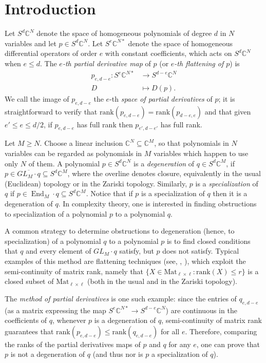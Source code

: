 \documentclass{toc}
\newcommand{\bbC}{\mathbb{C}}
\DeclareMathOperator{\End}{End}
\def\BC{\mathbb C}
\def\trank{\mathrm{rank}}
\newcommand{\Mat}{\mathrm{Mat}}
\begin{document}
\section{Introduction} 
 Let $S^d\BC^N$ denote the space of homogeneous polynomials of degree $d$ in $N$ variables and let $p\in S^d\BC^N$. Let $S^e\BC^{N*}$ denote the space of homogeneous differential operators of order $e$ with constant coefficients, which acts on $S^d\BC^N$ when $e\leq d$. The \emph{$e$-th partial derivative map}  of $p$  (or \emph{$e$-th flattening of $p$}) is
\begin{align} \label{flateqn}
p_{e,d-e}: S^e\BC^{N*}& \to S^{d-e}\BC^N\\
\nonumber D & \mapsto D(p).
\end{align}
 We call the image of $p_{e,d-e}$ the $e$-th \emph{space of partial derivatives} of $p$; it is straightforward to verify that $\trank (p_{e,d-e}) = \trank (p_{d-e,e})$ and that given $e' \leq e \leq d/2$, if $p_{e,d-e}$ has full rank then $p_{e',d-e'}$ has full rank.

Let $M\geq N$. Choose a linear inclusion $\bbC^N \subseteq \bbC^M$, so that polynomials in $N$ variables can be regarded as polynomials in $M$ variables which happen to use only $N$ of them. A polynomial $p\in S^d\BC^N$ is a \emph{degeneration} of $q\in S^d\BC^M$, if  $p\in \overline{GL_M\cdot q}\subseteq S^d\BC^M$, where the overline denotes closure, equivalently in the usual (Euclidean) topology or in the Zariski topology.  Similarly, $p$ is a \emph{specialization} of $q$ if $p \in \End_{M} \cdot q \subseteq S^d \bbC^M$. Notice that if $p$ is a specialization of $q$ then it is a degeneration of $q$. In complexity theory, one is interested in finding obstructions to specialization of a polynomial $p$ to a polynomial $q$.  

A common strategy to determine obstructions to degeneration (hence, to specialization) of a polynomial $q$ to a polynomial $p$ is to find closed conditions that $q$ and every element of $GL_M \cdot q$ satisfy, but $p$ does not satisfy. Typical examples of this method are flattening techniques (see, \eg, \cite{MR2901512}), which exploit the semi-continuity of matrix rank, namely that $\{ X \in \Mat_{\ell \times \ell} : \trank( X) \leq r\}$ is a closed subset of $\Mat_{\ell \times \ell}$ (both in the usual and in the Zariski topology).

 The \emph{method of partial derivatives} is one such example: since the entries of $q_{e,d-e}$ (as a matrix expressing the map $S^e \bbC^{N*}  \to S^{d-e} \bbC^N$) are continuous in the coefficients of $q$, whenever $p$ is a degeneration of $q$, semi-continuity of matrix rank guarantees that $\trank(p_{e,d-e})\leq \trank(q_{e,d-e})$ for all $e$. Therefore, comparing the ranks of the partial derivatives maps of $p$ and $q$ for any $e$, one can prove that $p$ is not a degeneration of $q$ (and thus nor is $p$ a specialization of $q$). 
\end{document}
